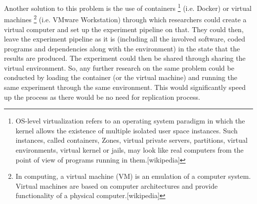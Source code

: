     Another solution to this problem is the use of containers \footnote{OS-level virtualization refers to an operating system paradigm 
    in which the kernel allows the existence of multiple isolated user space instances. Such instances, called containers, Zones, 
    virtual private servers, partitions, virtual environments, virtual kernel or jails, may look like real computers from 
    the point of view of programs running in them.[wikipedia]} (i.e. Docker) or virtual machines \footnote{In computing, 
    a virtual machine (VM) is an emulation of a computer system. Virtual machines are based on computer architectures and 
    provide functionality of a physical computer.[wikipedia]} (i.e. VMware Workstation) through which researchers could create  
    a virtual computer and set up the experiment pipeline on that. They could then, leave the experiment 
    pipeline as it is (including all the involved software, coded programs and dependencies along with the environment) 
    in the state that the results are produced. 
    The experiment could then be shared through sharing the virtual environment. So, any 
    further research on the same problem could be conducted by loading the container (or the virtual machine) and running 
    the same experiment through the same environment. This would significantly speed up the process as there would be no need for  
    replication process.

